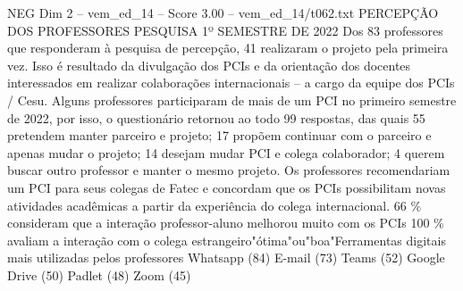 \begin{textsample}{NEG Dim 2 – vem\_ed\_14 – Score 3.00 – vem\_ed\_14/t062.txt}  \label{ex:f2_neg_070}
PERCEPÇÃO DOS PROFESSORES PESQUISA 1º SEMESTRE DE 2022 Dos 83 professores que responderam à pesquisa de percepção, 41 realizaram o projeto pela primeira vez.
Isso é resultado da divulgação dos PCIs e da orientação dos docentes interessados em realizar colaborações internacionais – a cargo da equipe dos PCIs / Cesu.
Alguns professores participaram de mais de um PCI no primeiro semestre de 2022, por isso, o questionário retornou ao todo 99 respostas, das quais 55 pretendem manter parceiro e projeto; 17 propõem continuar com o parceiro e apenas mudar o projeto; 14 desejam mudar PCI e colega colaborador; 4 querem buscar outro professor e manter o mesmo projeto.
Os professores recomendariam um PCI para seus colegas de Fatec e concordam que os PCIs possibilitam novas atividades acadêmicas a partir da experiência do colega internacional. 66 \% consideram que a interação professor-aluno melhorou muito com os PCIs 100 \% avaliam a interação com o colega estrangeiro"ótima"ou"boa"Ferramentas digitais mais utilizadas pelos professores Whatsapp (84) E-mail (73) Teams (52) Google Drive (50) Padlet (48) Zoom (45)

\end{textsample}
